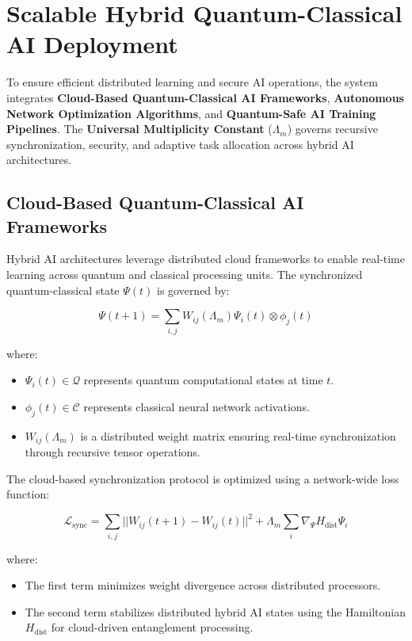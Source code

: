 \documentclass{article}
\theoremstyle{plain}
\begin{document}
\section{Scalable Hybrid Quantum-Classical AI Deployment}

To ensure efficient distributed learning and secure AI operations, the system integrates \textbf{Cloud-Based Quantum-Classical AI Frameworks}, \textbf{Autonomous Network Optimization Algorithms}, and \textbf{Quantum-Safe AI Training Pipelines}. The \textbf{Universal Multiplicity Constant} ($\Lambda_m$) governs recursive synchronization, security, and adaptive task allocation across hybrid AI architectures.

\subsection{Cloud-Based Quantum-Classical AI Frameworks}

Hybrid AI architectures leverage distributed cloud frameworks to enable real-time learning across quantum and classical processing units. The synchronized quantum-classical state $\Psi(t)$ is governed by:

\begin{equation}
    \Psi(t+1) = \sum_{i,j} W_{ij}(\Lambda_m) \Psi_i(t) \otimes \phi_j(t)
\end{equation}

where:
\begin{itemize}
    \item $\Psi_i(t) \in \mathcal{Q}$ represents quantum computational states at time $t$.
    \item $\phi_j(t) \in \mathcal{C}$ represents classical neural network activations.
    \item $W_{ij}(\Lambda_m)$ is a distributed weight matrix ensuring real-time synchronization through recursive tensor operations.
\end{itemize}

The cloud-based synchronization protocol is optimized using a network-wide loss function:

\begin{equation}
    \mathcal{L}_{\text{sync}} = \sum_{i,j} || W_{ij}(t+1) - W_{ij}(t) ||^2 + \Lambda_m \sum_{i} \nabla_{\Psi} H_{\text{dist}} \Psi_i
\end{equation}

where:
\begin{itemize}
    \item The first term minimizes weight divergence across distributed processors.
    \item The second term stabilizes distributed hybrid AI states using the Hamiltonian $H_{\text{dist}}$ for cloud-driven entanglement processing.
\end{itemize}
\end{document}
